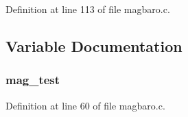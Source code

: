 Definition at line 113 of file magbaro.\-c.



\subsection{Variable Documentation}
\hypertarget{group___altitude_module_gaa3004787b6c594513faadd64e3e7de35}{
\subsubsection[{mag\-\_\-test}]{ mag\-\_\-test}}\label{group___altitude_module_gaa3004787b6c594513faadd64e3e7de35}


Definition at line 60 of file magbaro.\-c.

